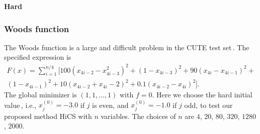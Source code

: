\documentclass[final,1p,times]{elsarticle}
\begin{document}
\textbf{Hard}

\newpage

\subsubsection{Woods function\,\cite{lukvsan2010modified, algopy}}
\label{subsec:woods}

The Woods function is a large and difficult problem in the CUTE test
set\,\cite{lukvsan2010modified}. The specified expression is  
\begin{equation}
	\begin{aligned}
		F(x) = \sum^{n/4}_{i=1} \Big[100(x_{4i-2}-x^2_{4i-3})^2 +
		(1-x_{4i-3})^2 + 90(x_{4i}-x_{4i-1})^2 +
		\\
		(1-x_{4i-1})^2 + 10(x_{4i-2}+x_{4i}-2)^2 +
		0.1(x_{4i-2}-x_{4i})^2
		\Big].
	\end{aligned}
	\label{eq:woods}
\end{equation}
The global minimizer is $(1,1,\dots,1)$ with $f=0$.
Here we choose the hard initial value\,\cite{}, i.e., $x_j^{(0)}=-3.0$ if
$j$ is even, and  $x_j^{(0)}=-1.0$ if $j$ odd, to test our
proposed method HiCS with $n$ variables. The choices of $n$ are
$4$, $20$, $80$, $320$, $1280$, $2000$. 
\end{document}
